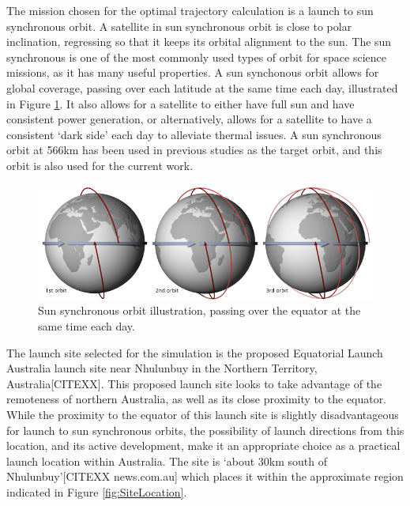The mission chosen for the optimal trajectory calculation is a launch to sun synchronous orbit. 
A satellite in sun synchronous orbit is close to polar inclination, regressing so that it keeps its orbital alignment to the sun. The sun synchronous is one of the most commonly used types of orbit for space science missions, as it has many useful properties\cite{Boain2004}. A sun synchonous orbit allows for global coverage, passing over each latitude at the same time each day, illustrated in Figure \ref{fig:SSO}. It also allows for a satellite to either have full sun and have consistent power generation, or alternatively, allows for a satellite to have a consistent `dark side' each day to alleviate thermal issues\cite{Boain2004}. A sun synchronous orbit at 566km has been used in previous studies as the target orbit\cite{Preller2017b}, and this orbit is also used for the current work. 
\begin{figure}[ht]
\centering
\includegraphics[width=0.8\linewidth]{figures/4_LODESTAR/SSO}
\caption{Sun synchronous orbit illustration, passing over the equator at the same time each day\cite{NASASSO}.}
\label{fig:SSO}
\end{figure}

The launch site selected for the simulation is the proposed Equatorial Launch Australia launch site near Nhulunbuy in the Northern Territory, Australia[CITEXX]. This proposed launch site looks to take advantage of the remoteness of northern Australia, as well as its close proximity to the equator. While the proximity to the equator of this launch site is slightly disadvantageous for launch to sun synchronous orbits, the possibility of launch directions from this location, and its active development, make it an appropriate choice as a practical launch location within Australia. The site is `about 30km south of Nhulunbuy'[CITEXX news.com.au] which places it within the approximate region indicated in Figure \ref{fig:SiteLocation}.

